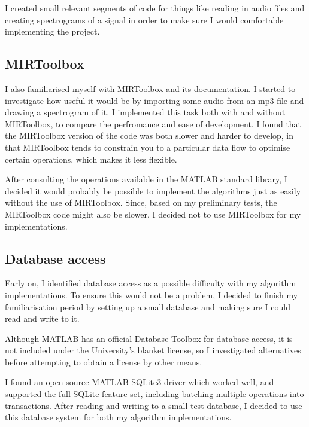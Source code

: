 \documentclass[12pt,a4paper,twoside,openright]{report}
\begin{document}
I created small relevant segments of code for things like reading in audio files and creating spectrograms of a signal in order to make sure I would comfortable implementing the project.

\subsection{MIRToolbox}

I also familiarised myself with MIRToolbox and its documentation. I started to investigate how useful it would be by importing some audio from an mp3 file and drawing a spectrogram of it. I implemented this task both with and without MIRToolbox, to compare the perfromance and ease of development. I found that the MIRToolbox version of the code was both slower and harder to develop, in that MIRToolbox tends to constrain you to a particular data flow to optimise certain operations, which makes it less flexible.

After consulting the operations available in the MATLAB standard library, I decided it would probably be possible to implement the algorithms just as easily without the use of MIRToolbox. Since, based on my preliminary tests, the MIRToolbox code might also be slower, I decided not to use MIRToolbox for my implementations.

\subsection{Database access}
\label{section:dbaccess}

Early on, I identified database access as a possible difficulty with my algorithm implementations. To ensure this would not be a problem, I decided to finish my familiarisation period by setting up a small database and making sure I could read and write to it.

Although MATLAB has an official Database Toolbox for database access, it is not included under the University's blanket license, so I investigated alternatives before attempting to obtain a license by other means.

I found an open source MATLAB SQLite3 driver \cite{Yamaguchi14} which worked well, and supported the full SQLite feature set, including batching multiple operations into transactions. After reading and writing to a small test database, I decided to use this database system for both my algorithm implementations.

\end{document}
